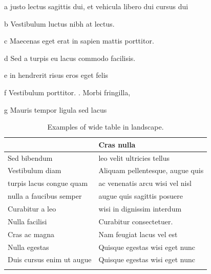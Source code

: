 \documentclass[]{uiophd}
\begin{document}
\begin{landscape}
	\begin{ThreePartTable}
	\begin{TableNotes}
		\item [a] {\footnotesize justo lectus sagittis dui, et vehicula libero dui cursus dui}
		\item [b] {\footnotesize Vestibulum luctus nibh at lectus.}
		\item [c] {\footnotesize  Maecenas eget erat in sapien mattis porttitor.}
		\item [d] {\footnotesize   Sed a turpis eu lacus commodo facilisis.}
		\item [e] {\footnotesize  in hendrerit risus eros eget felis}
		\item [f] {\footnotesize  Vestibulum porttitor. . Morbi fringilla,}
		\item [g] {\footnotesize   Mauris tempor ligula sed lacus} 
		
	\end{TableNotes}
\begin{longtable}{ll}
	\caption{Examples of wide table in landscape.}\\
	\label{tab:wideTable}
	\begin{tabular}{ll}
		\toprule
		\textbf{Fusce mauris}	& \textbf{Cras nulla}	\\
		\midrule
		Sed bibendum \tnote{a}					&  leo velit ultricies tellus \\
		Vestibulum diam \tnote{b}				&  Aliquam pellentesque, augue quis \\
		turpis lacus congue quam				& ac venenatis arcu wisi vel nisl \\
		nulla a faucibus semper \tnote{c} 		& augue quis sagittis posuere \\
		Curabitur a leo	\tnote{d}	 			& 	wisi in dignissim interdum \\
	    Nulla facilisi	\tnote{e}				& 	Curabitur consectetuer. \\
	 	Cras ac magna \tnote{f}	 				& 	Nam feugiat lacus vel est \\
	 	Nulla egestas							& Quisque egestas wisi eget nunc\\
	 	Duis cursus enim ut augue \tnote{g}	& 	Quisque egestas wisi eget nunc \\
		\bottomrule
		
		\insertTableNotes
	\end{tabular}

\end{longtable}
\end{ThreePartTable}
\end{landscape}
\end{document}
